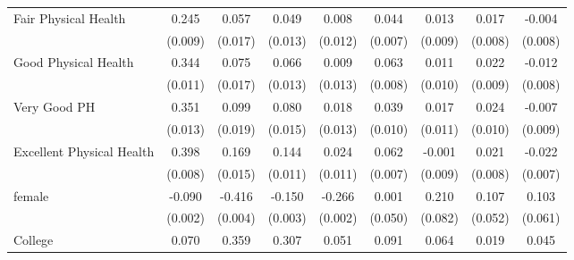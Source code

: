 \begin{table}
\begin{tabular}{l*{8}{c}}
Fair Physical Health&       0.245\sym{***}&       0.057\sym{***}&       0.049\sym{***}&       0.008         &       0.044\sym{***}&       0.013         &       0.017\sym{*}  &      -0.004         \\
                    &     (0.009)         &     (0.017)         &     (0.013)         &     (0.012)         &     (0.007)         &     (0.009)         &     (0.008)         &     (0.008)         \\
Good Physical Health&       0.344\sym{***}&       0.075\sym{***}&       0.066\sym{***}&       0.009         &       0.063\sym{***}&       0.011         &       0.022\sym{*}  &      -0.012         \\
                    &     (0.011)         &     (0.017)         &     (0.013)         &     (0.013)         &     (0.008)         &     (0.010)         &     (0.009)         &     (0.008)         \\
Very Good PH        &       0.351\sym{***}&       0.099\sym{***}&       0.080\sym{***}&       0.018         &       0.039\sym{***}&       0.017         &       0.024\sym{*}  &      -0.007         \\
                    &     (0.013)         &     (0.019)         &     (0.015)         &     (0.013)         &     (0.010)         &     (0.011)         &     (0.010)         &     (0.009)         \\
Excellent Physical Health&       0.398\sym{***}&       0.169\sym{***}&       0.144\sym{***}&       0.024\sym{*}  &       0.062\sym{***}&      -0.001         &       0.021\sym{**} &      -0.022\sym{**} \\
                    &     (0.008)         &     (0.015)         &     (0.011)         &     (0.011)         &     (0.007)         &     (0.009)         &     (0.008)         &     (0.007)         \\
female              &      -0.090\sym{***}&      -0.416\sym{***}&      -0.150\sym{***}&      -0.266\sym{***}&       0.001         &       0.210\sym{*}  &       0.107\sym{*}  &       0.103         \\
                    &     (0.002)         &     (0.004)         &     (0.003)         &     (0.002)         &     (0.050)         &     (0.082)         &     (0.052)         &     (0.061)         \\
College             &       0.070\sym{***}&       0.359\sym{***}&       0.307\sym{***}&       0.051\sym{***}&       0.091\sym{***}&       0.064\sym{**} &       0.019         &       0.045\sym{**} \\

\end{tabular}
\end{table}
